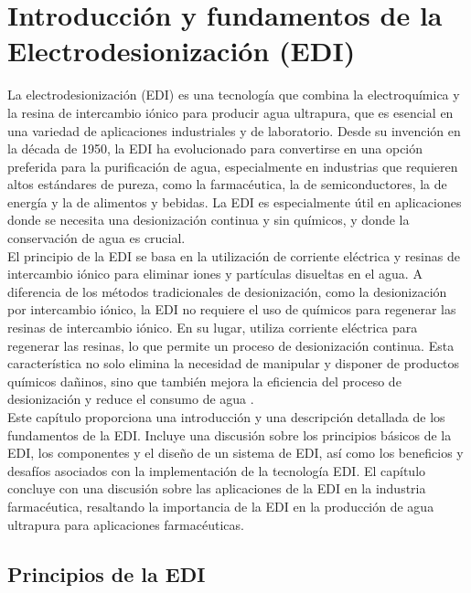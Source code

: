 \chapter{Introducción y fundamentos de la Electrodesionización (EDI)}\label{cap:fundamentosEDI}

La electrodesionización (EDI) es una tecnología que combina la electroquímica y la resina de intercambio iónico
para producir agua ultrapura, que es esencial en una variedad de aplicaciones industriales y de laboratorio.
Desde su invención en la década de 1950, la EDI ha evolucionado para convertirse en una opción preferida para
la purificación de agua, especialmente en industrias que requieren altos estándares de pureza, como la farmacéutica,
la de semiconductores, la de energía y la de alimentos y bebidas. La EDI es especialmente útil en aplicaciones donde se
necesita una desionización continua y sin químicos, y donde la conservación de agua es crucial. \\

El principio de la EDI se basa en la utilización de corriente eléctrica y resinas de intercambio iónico
para eliminar iones y partículas disueltas en el agua. A diferencia de los métodos tradicionales de desionización,
como la desionización por intercambio iónico, la EDI no requiere el uso de químicos para regenerar las resinas de
intercambio iónico. En su lugar, utiliza corriente eléctrica para regenerar las resinas, lo que permite un proceso
de desionización continua. Esta característica no solo elimina la necesidad de manipular y disponer de productos
químicos dañinos, sino que también mejora la eficiencia del proceso de desionización y reduce el consumo de agua \cite{ObtencionAguaUltrapura2019}. \\

Este capítulo proporciona una introducción y una descripción detallada de los fundamentos de la EDI. Incluye una
discusión sobre los principios básicos de la EDI, los componentes y el diseño de un sistema de EDI, así como los
beneficios y desafíos asociados con la implementación de la tecnología EDI. El capítulo concluye con una discusión
sobre las aplicaciones de la EDI en la industria farmacéutica, resaltando la importancia de la EDI en la producción
de agua ultrapura para aplicaciones farmacéuticas. \\

\section{Principios de la EDI}

